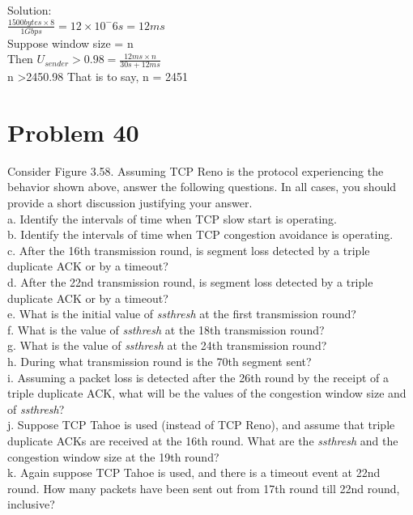 \documentclass{article}
\begin{document}
\noindent Solution:\\

$ \frac{1500 bytes \times 8}{1 Gbps} = 12 \times 10^-6 s = 12 ms $ \\

Suppose window size = n \\

Then $ U_{sender} > 0.98 = \frac{12ms \times n}{30s + 12ms} $ \\

n \textgreater 2450.98 That is to say, n = 2451


\newpage
\section{Problem 40} Consider Figure 3.58. Assuming TCP Reno is the protocol experiencing the behavior shown above, answer the following questions. In all cases, you should provide a short discussion justifying your answer.\\
a. Identify the intervals of time when TCP slow start is operating.\\
b. Identify the intervals of time when TCP congestion avoidance is operating.\\
c. After the 16th transmission round, is segment loss detected by a triple duplicate ACK or by a timeout?\\
d. After the 22nd transmission round, is segment loss detected by a triple duplicate ACK or by a timeout? \\
e. What is the initial value of \emph{ssthresh} at the first transmission round?\\
f. What is the value of \emph{ssthresh} at the 18th transmission round?\\
g. What is the value of \emph{ssthresh} at the 24th transmission round?\\
h. During what transmission round is the 70th segment sent?\\
i. Assuming a packet loss is detected after the 26th round by the receipt of a triple duplicate ACK, what will be the values of the congestion window size and of \emph{ssthresh}?\\
j. Suppose TCP Tahoe is used (instead of TCP Reno), and assume that triple duplicate ACKs are received at the 16th round. What are the \emph{ssthresh} and the congestion window size at the 19th round?\\
k. Again suppose TCP Tahoe is used, and there is a timeout event at 22nd round. How many packets have been sent out from 17th round till 22nd round, inclusive?
\end{document}
